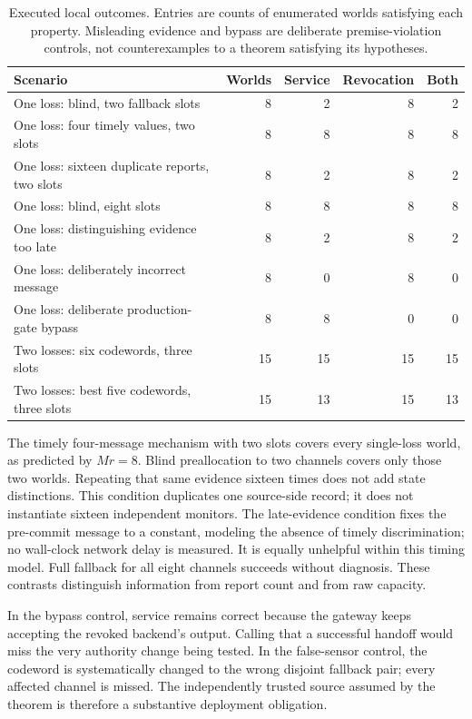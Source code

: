 \documentclass[11pt,a4paper]{article}
\theoremstyle{definition}\newtheorem{definition}{Definition}
\begin{document}
\begin{table}[t]
\centering\small
\caption{Executed local outcomes. Entries are counts of enumerated worlds satisfying each property. Misleading evidence and bypass are deliberate premise-violation controls, not counterexamples to a theorem satisfying its hypotheses.}
\label{tab:protocol}
\begin{tabularx}{\linewidth}{@{}Xrrrr@{}}\toprule
Scenario & Worlds & Service & Revocation & Both\\\midrule
One loss: blind, two fallback slots &8&2&8&2\\
One loss: four timely values, two slots &8&8&8&8\\
One loss: sixteen duplicate reports, two slots &8&2&8&2\\
One loss: blind, eight slots &8&8&8&8\\
One loss: distinguishing evidence too late &8&2&8&2\\
One loss: deliberately incorrect message &8&0&8&0\\
One loss: deliberate production-gate bypass &8&8&0&0\\
Two losses: six codewords, three slots &15&15&15&15\\
Two losses: best five codewords, three slots &15&13&15&13\\\bottomrule
\end{tabularx}
\end{table}
The timely four-message mechanism with two slots covers every single-loss world, as predicted by $Mr=8$. Blind preallocation to two channels covers only those two worlds. Repeating that same evidence sixteen times does not add state distinctions. This condition duplicates one source-side record; it does not instantiate sixteen independent monitors. The late-evidence condition fixes the pre-commit message to a constant, modeling the absence of timely discrimination; no wall-clock network delay is measured. It is equally unhelpful within this timing model. Full fallback for all eight channels succeeds without diagnosis. These contrasts distinguish information from report count and from raw capacity.

In the bypass control, service remains correct because the gateway keeps accepting the revoked backend's output. Calling that a successful handoff would miss the very authority change being tested. In the false-sensor control, the codeword is systematically changed to the wrong disjoint fallback pair; every affected channel is missed. The independently trusted source assumed by the theorem is therefore a substantive deployment obligation.
\end{document}
